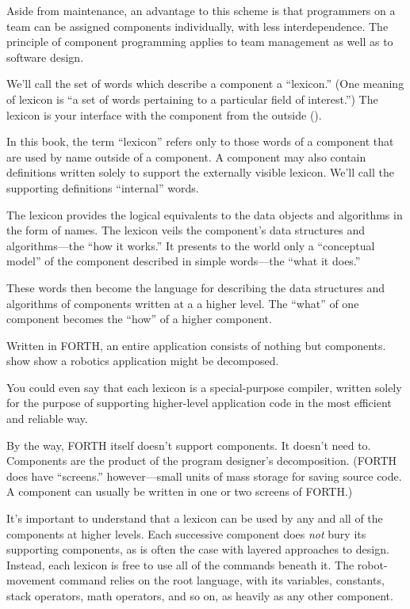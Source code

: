 Aside from maintenance, an advantage to this scheme is that programmers
on a team can be assigned components individually, with less interdependence.
The principle of component programming applies to team management
as well as to software design.


We'll call the set of words which describe a component a {}``lexicon.''
(One meaning of lexicon is {}``a set of words pertaining to a particular
field of interest.'') The lexicon is your interface with the component
from the outside ().

In this book, the term {}``lexicon'' refers only to those words
of a component that are used by name outside of a component. A component
may also contain definitions written solely to support the externally
visible lexicon. We'll call the supporting definitions {}``internal''
words.


The lexicon provides the logical equivalents to the data objects and
algorithms in the form of names. The lexicon veils the component's
data structures and algorithms---the {}``how it works.'' It presents
to the world only a {}``conceptual model'' of the component described
in simple words---the {}``what it does.''

These words then become the language for describing the data structures
and algorithms of components written at a a higher level. The {}``what''
of one component becomes the {}``how'' of a higher component.


Written in FORTH, an entire application consists of nothing but components.
 show show a robotics application might be decomposed.

You could even say that each lexicon is a special-purpose compiler,
written solely for the purpose of supporting higher-level application
code in the most efficient and reliable way.

By the way, FORTH itself doesn't support components. It doesn't need
to. Components are the product of the program designer's decomposition.
(FORTH does have {}``screens.'' however---small units of mass storage
for saving source code. A component can usually be written in one
or two screens of FORTH.)

It's important to understand that a lexicon can be used by any and
all of the components at higher levels. Each successive component
does \emph{not} bury its supporting components, as is often the case
with layered approaches to design. Instead, each lexicon is free to
use all of the commands beneath it. The robot-movement command relies
on the root language, with its variables, constants, stack operators,
math operators, and so on, as heavily as any other component.

